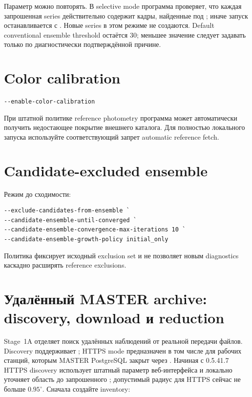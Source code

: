 Параметр  можно повторять. В selective mode программа проверяет, что каждая
запрошенная series действительно содержит кадры, найденные под ; иначе запуск
останавливается с . Новые series в этом режиме
не создаются. Default conventional ensemble threshold остаётся 30; меньшее значение следует
задавать только по диагностически подтверждённой причине.

\section{Color calibration}

\begin{lstlisting}
--enable-color-calibration
\end{lstlisting}

При штатной политике reference photometry программа может автоматически получить недостающее покрытие внешнего каталога. Для полностью локального запуска используйте соответствующий запрет automatic reference fetch.

\section{Candidate-excluded ensemble}

Режим до сходимости:

\begin{lstlisting}
--exclude-candidates-from-ensemble `
--candidate-ensemble-until-converged `
--candidate-ensemble-convergence-max-iterations 10 `
--candidate-ensemble-growth-policy initial_only
\end{lstlisting}

Политика  фиксирует исходный exclusion set и не позволяет новым diagnostics каскадно расширять reference exclusions.


\section{Удалённый MASTER archive: discovery, download и reduction}

Stage~1A отделяет поиск удалённых наблюдений от реальной передачи файлов. Discovery поддерживает ; HTTPS mode предназначен в том числе для рабочих станций, которым MASTER PostgreSQL закрыт через . Начиная с 0.5.41.7 HTTPS discovery использует штатный параметр  веб-интерфейса и локально уточняет область до запрошенного ; допустимый радиус для HTTPS сейчас не больше $0.95^\circ$. Сначала создайте inventory:

